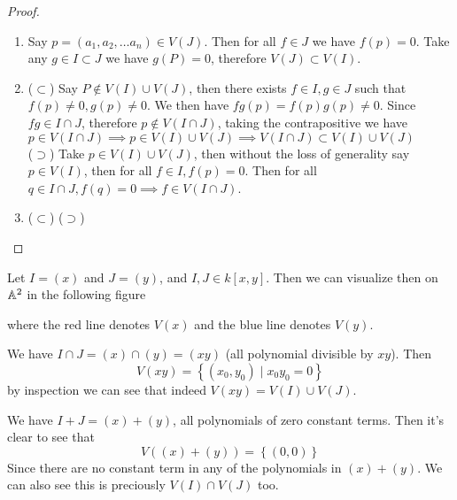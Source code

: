\begin{proof}
\begin{enumerate}
	\item Say $p = (a_1, a_2, \ldots a_n) \in V(J)$. Then for all $f \in J$ we have $f(p) = 0$. Take any $g \in I \subset J$ we have $g(P) = 0$, therefore $V(J) \subset V(I)$.
	\item ($\subset$) Say $P \not \in V(I) \cup V(J)$, then there exists $f \in I, g \in J$ such that $f(p) \neq 0, g(p) \neq 0$. We then have $fg(p) = f(p) g(p) \neq 0$. Since $fg \in I \cap J$, therefore $p \not\in V(I \cap J)$, taking the contrapositive we have $p \in V(I \cap J) \implies p \in V(I) \cup V(J) \implies V(I \cap J) \subset V(I) \cup V(J)$ \\
	($\supset$) Take $p \in V(I) \cup V(J)$, then without the loss of generality say $p \in V(I)$, then for all $f \in I, f(p) = 0$. Then for all $q \in I \cap J, f(q) = 0 \implies f \in V(I \cap J)$.
	\item ($\subset$)
	($\supset$)
\end{enumerate}
\end{proof}

\begin{example}
Let $I = (x)$ and $J = (y)$, and $I,J \in k[x,y]$. Then we can visualize then on $\mathbb A^2$ in the following figure 
\begin{center}
\end{center}
where the red line denotes  $V(x)$ and the blue line denotes $V(y)$.

We have $I \cap J = (x) \cap (y) = (xy)$ (all polynomial divisible by $xy$). Then
\[ V(xy) = \left\{ (x_0, y_0) \mid x_0y_0 = 0 \right\}\]
by inspection we can see that indeed $V(xy) = V(I) \cup V(J)$.

We have $I + J = (x) + (y)$, all polynomials of zero constant terms. Then it's clear to see that
\[ V((x) + (y)) = \left\{ (0,0) \right\}\]
Since there are no constant term in any of the polynomials in $(x) + (y)$. We can also see this is preciously $V(I) \cap V(J)$ too.

\end{example}









